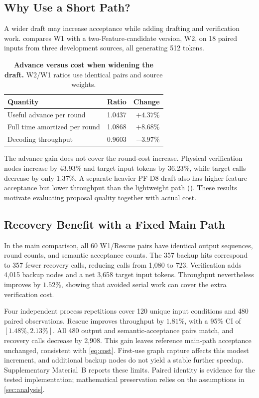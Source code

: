 \subsection{Why Use a Short Path?}
A wider draft may increase acceptance while adding drafting and verification work.  compares W1 with a two-Feature-candidate version, W2, on 18 paired inputs from three development sources, all generating 512 tokens.
\begin{table}[t]
\centering\small
\caption{\textbf{Advance versus cost when widening the draft.} W2/W1 ratios use identical pairs and source weights.}
\label{tab:width}
\begin{tabular}{@{}lrr@{}}\toprule
Quantity & Ratio & Change\\\midrule
Useful advance per round & 1.0437 & $+4.37\%$\\
Full time amortized per round & 1.0868 & $+8.68\%$\\
Decoding throughput & 0.9603 & $-3.97\%$\\\bottomrule
\end{tabular}
\end{table}
The advance gain does not cover the round-cost increase. Physical verification nodes increase by $43.93\%$ and target input tokens by $36.23\%$, while target calls decrease by only $1.37\%$. A separate heavier PF-D8 draft also has higher feature acceptance but lower throughput than the lightweight path (). These results motivate evaluating proposal quality together with actual cost.

\subsection{Recovery Benefit with a Fixed Main Path}
In the main comparison, all 60 W1/Rescue pairs have identical output sequences, round counts, and semantic acceptance counts. The 357 backup hits correspond to 357 fewer recovery calls, reducing calls from 1,080 to 723. Verification adds 4,015 backup nodes and a net 3,658 target input tokens. Throughput nevertheless improves by $1.52\%$, showing that avoided serial work can cover the extra verification cost.

Four independent process repetitions cover 120 unique input conditions and 480 paired observations. Rescue improves throughput by $1.81\%$, with a 95\% CI of $[1.48\%,2.13\%]$. All 480 output and semantic-acceptance pairs match, and recovery calls decrease by 2,908. This gain leaves reference main-path acceptance unchanged, consistent with \cref{eq:cost}. First-use graph capture affects this modest increment, and additional backup nodes do not yield a stable further speedup. Supplementary Material~B reports these limits. Paired identity is evidence for the tested implementation; mathematical preservation relies on the assumptions in \cref{sec:analysis}.

